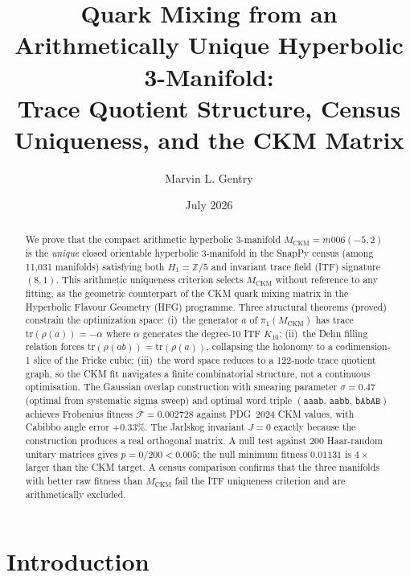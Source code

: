 \documentclass[11pt,a4paper]{article}
\theoremstyle{remark}
\newcommand{\MCKM}{M_{\mathrm{CKM}}}
\newcommand{\Kten}{K_{10}}
\begin{document}
\title{Quark Mixing from an Arithmetically Unique Hyperbolic 3-Manifold:\\
Trace Quotient Structure, Census Uniqueness, and the CKM Matrix}

\author[1]{Marvin L. Gentry}
\date{July 2026}
\maketitle

\begin{abstract}
We prove that the compact arithmetic hyperbolic 3-manifold
$\MCKM = m006(-5,2)$ is the \emph{unique} closed orientable hyperbolic
3-manifold in the SnapPy census (among 11,031 manifolds) satisfying
both $H_1 = \mathbb{Z}/5$ and invariant trace field (ITF) signature $(8,1)$.
This arithmetic uniqueness criterion selects $\MCKM$ without reference to any
fitting, as the geometric counterpart of the CKM quark mixing matrix in the
Hyperbolic Flavour Geometry (HFG) programme.
Three structural theorems (proved) constrain the optimization space:
(i)~the generator $a$ of $\pi_1(\MCKM)$ has trace $\mathrm{tr}(\rho(a)) = -\alpha$
where $\alpha$ generates the degree-10 ITF $\Kten$;
(ii)~the Dehn filling relation forces $\mathrm{tr}(\rho(ab)) = \mathrm{tr}(\rho(a))$,
collapsing the holonomy to a codimension-1 slice of the Fricke cubic;
(iii)~the word space reduces to a 122-node trace quotient graph,
so the CKM fit navigates a finite combinatorial structure, not a
continuous optimisation.
The Gaussian overlap construction with smearing parameter $\sigma = 0.47$
(optimal from systematic sigma sweep)
and optimal word triple $(\mathtt{aaab},\, \mathtt{aabb},\, \mathtt{bAbAB})$
achieves Frobenius fitness $\mathcal{F} = 0.002728$
against PDG~2024 CKM values, with Cabibbo angle error $+0.33\%$.
The Jarlskog invariant $J = 0$ exactly because the construction produces
a real orthogonal matrix.
A null test against $200$ Haar-random unitary matrices gives $p = 0/200 < 0.005$;
the null minimum fitness $0.01131$ is $4\times$ larger than the CKM target.
A census comparison confirms that the three manifolds with better raw
fitness than $\MCKM$ fail the ITF uniqueness criterion and are
arithmetically excluded.
\end{abstract}

\section{Introduction}
\label{sec:intro}
\end{document}
